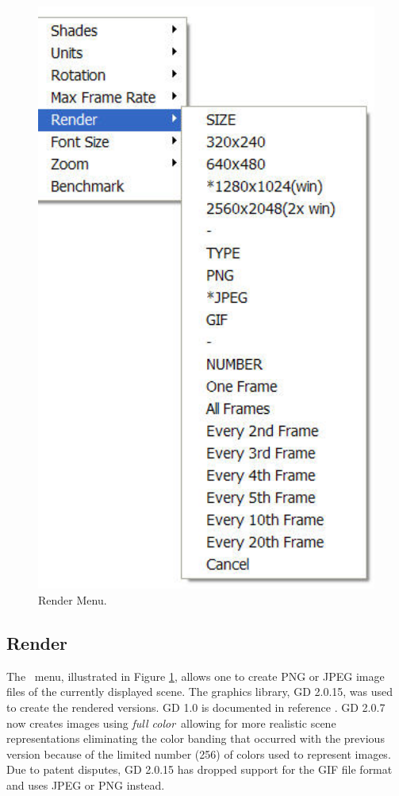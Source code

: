 \documentclass[11pt,twoside]{book}
\newcommand{\figoptions}{hbp}
\newcommand{\frameit}[1]{\fbox{\tt #1}}
\begin{document}
\begin{figure}[\figoptions]
\begin{center}
\includegraphics[width=4.4166666in]{figures/menu_render2}
\caption{Render Menu.} \label{fig_rendermenu}
\end{center}
\end{figure}

\subsection{Render}
The \frameit{Render}\ menu, illustrated in Figure
\ref{fig_rendermenu}, allows one to create PNG or JPEG image files
of the currently displayed scene. The graphics library, GD 2.0.15,
was used to create the rendered versions.  GD 1.0 is documented in
reference \cite[Appendix 4]{BOUTELL}.  GD 2.0.7 now creates images
using {\em full color}\ allowing for more realistic scene
representations eliminating the color banding that occurred with
the previous version because of the limited number (256) of colors
used to represent images. Due to patent disputes, GD 2.0.15 has
dropped support for the GIF file format and uses JPEG or PNG
instead.
\end{document}
